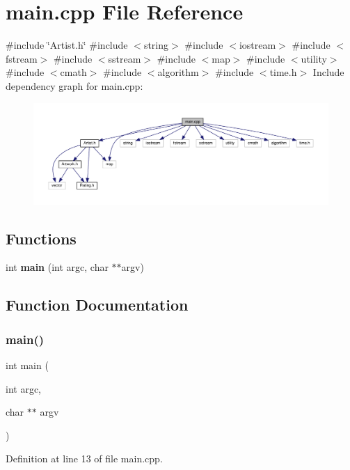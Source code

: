\section{main.\+cpp File Reference}
\label{main_8cpp}
{\ttfamily \#include \char`\"{}Artist.\+h\char`\"{}}\newline
{\ttfamily \#include $<$string$>$}\newline
{\ttfamily \#include $<$iostream$>$}\newline
{\ttfamily \#include $<$fstream$>$}\newline
{\ttfamily \#include $<$sstream$>$}\newline
{\ttfamily \#include $<$map$>$}\newline
{\ttfamily \#include $<$utility$>$}\newline
{\ttfamily \#include $<$cmath$>$}\newline
{\ttfamily \#include $<$algorithm$>$}\newline
{\ttfamily \#include $<$time.\+h$>$}\newline
Include dependency graph for main.\+cpp\+:\nopagebreak
\begin{figure}[H]
\begin{center}
\leavevmode
\includegraphics[width=350pt]{main_8cpp__incl}
\end{center}
\end{figure}
\subsection*{Functions}
\begin{DoxyCompactItemize}
\item 
int \textbf{ main} (int argc, char $\ast$$\ast$argv)
\end{DoxyCompactItemize}


\subsection{Function Documentation}
\mbox{\label{main_8cpp_a3c04138a5bfe5d72780bb7e82a18e627}} 
\subsubsection{main()}
{\footnotesize\ttfamily int main (\begin{DoxyParamCaption}\item[{int}]{argc,  }\item[{char $\ast$$\ast$}]{argv }\end{DoxyParamCaption})}



Definition at line 13 of file main.\+cpp.


